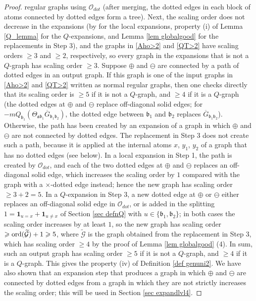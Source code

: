 \documentclass{article}
\newcommand{\1}{\mathds{1}}
\numberwithin{equation}{section}
\newcommand{\ord}{{\rm{ord}}}
\newcommand{\fa}{{\mathfrak a}}
\newcommand{\fb}{{\mathfrak b}}
\renewcommand{\cal}{\mathcal}
\newcommand{\wt}{\widetilde}
\renewcommand{\geq}{\geqslant}
\renewcommand{\ge}{\geq}
\theoremstyle{plain} %
\theoremstyle{remark}
\begin{document}
\begin{proof}
regular graphs using $\cal O_{dot}$ (after merging, the dotted edges in each block of atoms connected by dotted edges form a tree). Next, the scaling order does not decrease in the expansions (by \cite[Lemmas 3.9, 3.13, 3.16 and 3.19]{PartI_high} for the local expansions, property (i) of Lemma \ref{Q_lemma} for the $Q$-expansions, and Lemma \ref{lem globalgood} for the replacements in Step 3), and the graphs in \eqref{Aho>2} and \eqref{QT>2} have scaling orders $\ge 3$ and $\ge 2$, respectively, so every graph in the expansions that is not a $Q$-graph has scaling order $\ge 3$. Suppose $\oplus$ and $\ominus$ are connected by a path of dotted edges in an output graph. If this graph is one of the input graphs in \eqref{Aho>2} and \eqref{QT>2} written as normal regular graphs, then one checks directly that its scaling order is $\ge 5$ if it is not a $Q$-graph, and $\ge 4$ if it is a $Q$-graph (the dotted edges at $\oplus$ and $\ominus$ replace off-diagonal solid edges; for $- m Q_{\fb_1} ( \Theta_{\fa\fb_1} \overline G_{\fb_1 \fb_2})$, the dotted edge between $\fb_1$ and $\fb_2$ replaces $\overline G_{\fb_1 \fb_2}$). Otherwise, the path has been created by an expansion of a graph in which $\oplus$ and $\ominus$ are not connected by dotted edges. The replacement in Step 3 does not create such a path, because it is applied at the internal atoms $x$, $y_1$, $y_2$ of a graph that has no dotted edges (see below). In a local expansion in Step 1, the path is created by $\cal O_{dot}$, and each of the two dotted edges at $\oplus$ and $\ominus$ replaces an off-diagonal solid edge, which increases the scaling order by $1$ compared with the graph with a $\times$-dotted edge instead; hence the new graph has scaling order $\ge 3+2=5$. In a $Q$-expansion in Step 3, a new dotted edge at $\oplus$ or $\ominus$ either replaces an off-diagonal solid edge in $\cal O_{dot}$, or is added in the splitting $1=\mathbf 1_{u=x}+\mathbf 1_{u\ne x}$ of Section \ref{sec defnQ} with $u\in\{\fb_1,\fb_2\}$; in both cases the scaling order increases by at least $1$, so the new graph has scaling order $\ge \ord(\wt{\cal G})+1\ge 5$, where $\wt{\cal G}$ is the graph obtained from the replacement in Step 3, which has scaling order $\ge 4$ by the proof of Lemma \ref{lem globalgood} (4). In sum, such an output graph has scaling order $\ge 5$ if it is not a $Q$-graph, and $\ge 4$ if it is a $Q$-graph. This gives the property (iv) of Definition \ref{def genuni2}. We have also shown that an expansion step that produces a graph in which $\oplus$ and $\ominus$ are connected by dotted edges from a graph in which they are not strictly increases the scaling order; this will be used in Section \ref{sec expandlvl4}.


\end{proof}
\end{document}
